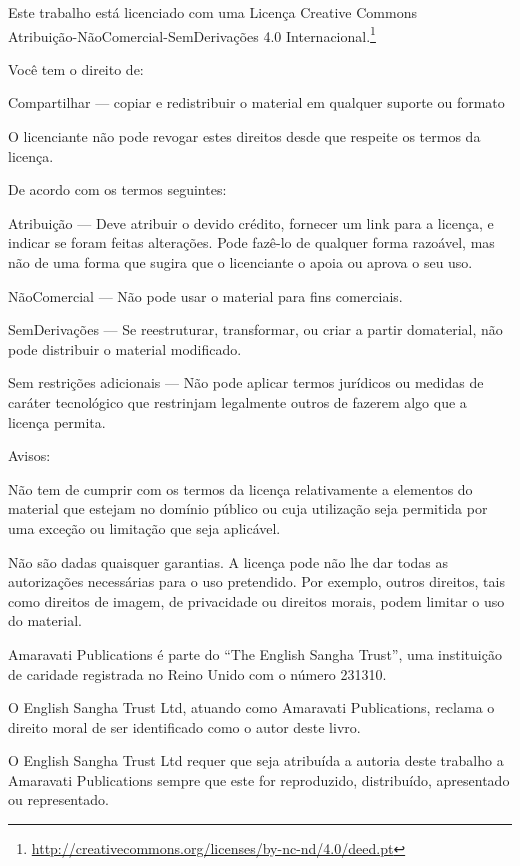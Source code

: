 \cleartorecto
\thispagestyle{chapter}
{\copyrightsize\setlength{\parindent}{0pt}%
\raggedright\label{copyright-details}
\setlength{\parskip}{7pt}

{\centering

{\LARGE\ccbyncnd}

Este trabalho está licenciado com uma Licença Creative Commons\\
Atribuição-NãoComercial-SemDerivações 4.0 Internacional.\footnote{%
\href{http://creativecommons.org/licenses/by-nc-nd/4.0/deed.pt}{http://creativecommons.org/licenses/by-nc-nd/4.0/deed.pt}}

}

Você tem o direito de:

\begin{packeditemize}
\item Compartilhar — copiar e redistribuir o material em qualquer suporte ou formato
\end{packeditemize}

O licenciante não pode revogar estes direitos desde que respeite os termos da licença.

De acordo com os termos seguintes:

\begin{packeditemize}
\item Atribuição — Deve atribuir o devido crédito, fornecer um link para a licença, e indicar se foram feitas alterações. Pode fazê-lo de qualquer forma razoável, mas não de uma forma que sugira que o licenciante o apoia ou aprova o seu uso.
\item NãoComercial — Não pode usar o material para fins comerciais.
\item SemDerivações — Se reestruturar, transformar, ou criar a partir domaterial, não pode distribuir o material modificado.
\end{packeditemize}

Sem restrições adicionais — Não pode aplicar termos jurídicos ou medidas de caráter tecnológico que restrinjam legalmente outros de fazerem algo que a licença permita.

Avisos:

Não tem de cumprir com os termos da licença relativamente a elementos do material que estejam no domínio público ou cuja utilização seja permitida por uma exceção ou limitação que seja aplicável.

Não são dadas quaisquer garantias. A licença pode não lhe dar todas as autorizações necessárias para o uso pretendido. Por exemplo, outros direitos, tais como direitos de imagem, de privacidade ou direitos morais, podem limitar o uso do material.


Amaravati Publications é parte do ``The English Sangha Trust'', uma
instituição de caridade registrada no Reino Unido com o número 231310.

O English Sangha Trust Ltd, atuando como Amaravati Publications, reclama
o direito moral de ser identiﬁcado como o autor deste livro.

O English Sangha Trust Ltd requer que seja atribuída a autoria deste
trabalho a Amaravati Publications sempre que este for reproduzido,
distribuído, apresentado ou representado.

}
